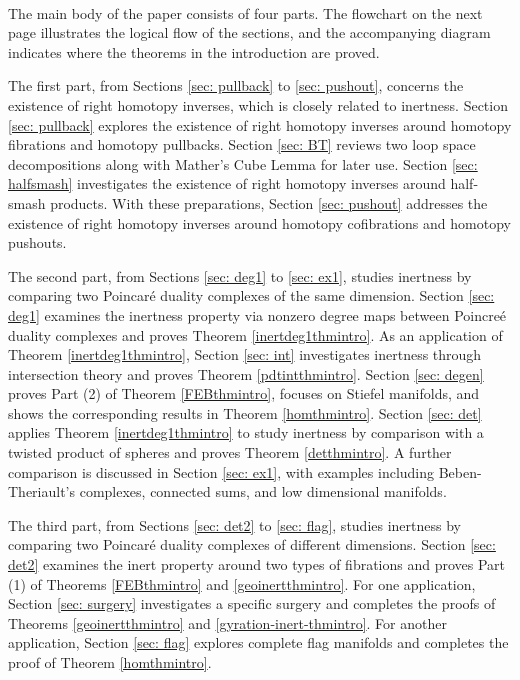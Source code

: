 \documentclass[a4]{amsart}
\theoremstyle{definition}
\begin{document}
\begin{sloppypar}
$\, $

The main body of the paper consists of four parts. The flowchart on the next page illustrates the logical flow of the sections, and the accompanying diagram indicates where the theorems in the introduction are proved.

The first part, from Sections \ref{sec: pullback} to \ref{sec: pushout}, concerns the existence of right homotopy inverses, which is closely related to inertness. 
Section \ref{sec: pullback} explores the existence of right homotopy inverses around homotopy fibrations and homotopy pullbacks. 
Section \ref{sec: BT} reviews two loop space decompositions along with Mather's Cube Lemma for later use. 
Section \ref{sec: halfsmash} investigates the existence of right homotopy inverses around half-smash products. 
With these preparations, Section \ref{sec: pushout} addresses the existence of right homotopy inverses around homotopy cofibrations and homotopy pushouts. 

The second part, from Sections \ref{sec: deg1} to \ref{sec: ex1}, studies inertness by comparing two Poincar\'{e} duality complexes of the same dimension. 
Section \ref{sec: deg1} examines the inertness property via nonzero degree maps between Poincre\'{e} duality complexes and proves Theorem \ref{inertdeg1thmintro}. 
As an application of Theorem \ref{inertdeg1thmintro}, Section \ref{sec: int} investigates inertness through intersection theory and proves Theorem \ref{pdtintthmintro}. 
Section \ref{sec: degen} proves Part (2) of Theorem \ref{FEBthmintro}, focuses on Stiefel manifolds, and shows the corresponding results in Theorem \ref{homthmintro}. 
Section \ref{sec: det} applies Theorem \ref{inertdeg1thmintro} to study inertness by comparison with a twisted product of spheres and proves Theorem \ref{detthmintro}. 
A further comparison is discussed in Section \ref{sec: ex1}, with examples including Beben-Theriault's complexes, connected sums, and low dimensional manifolds. 

The third part, from Sections \ref{sec: det2} to \ref{sec: flag}, studies inertness by comparing two Poincar\'{e} duality complexes of different dimensions. 
Section \ref{sec: det2} examines the inert property around two types of fibrations and proves Part (1) of Theorems \ref{FEBthmintro} and \ref{geoinertthmintro}. 
For one application, Section \ref{sec: surgery} investigates a specific surgery and completes the proofs of Theorems \ref{geoinertthmintro} and \ref{gyration-inert-thmintro}.
For another application, Section \ref{sec: flag} explores complete flag manifolds and completes the proof of Theorem \ref{homthmintro}.


\end{sloppypar}
\end{document}
